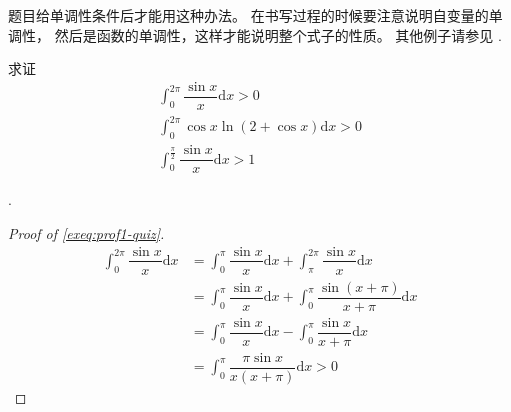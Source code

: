 题目给单调性条件后才能用这种办法。
在书写过程的时候要注意说明自变量的单调性，
然后是函数的单调性，这样才能说明整个式子的性质。
其他例子请参见 \cite[page 119, pdf 130]{we}.

\begin{example}
    求证
    \begin{gather}
        \label{exeq:prof1-quiz} \int_0^{2\pi} \dfrac{\sin x}{x} \mathrm dx > 0 \\
        \label{exeq:prof2-quiz} \int_0^{2\pi} \cos x \ln ( 2+ \cos x) \mathrm dx > 0 \\
        \label{exeq:prof3-quiz} \int_0^{\frac{\pi}{2}} \dfrac{\sin x}{x} \mathrm dx > 1
    \end{gather}

    \cite[question 183]{w660}.

    \begin{proof}[Proof of \ref{exeq:prof1-quiz}]
        \begin{align*}
            \int_0^{2\pi} \dfrac{\sin x}{x} \mathrm dx
            &= \int_0^{\pi} \dfrac{\sin x}{x} \mathrm dx 
            + \int_{\pi}^{2\pi} \dfrac{\sin x}{x} \mathrm dx \\
            &= \int_0^{\pi} \dfrac{\sin x}{x} \mathrm dx 
            + \int_{0}^{\pi} \dfrac{\sin (x + \pi)}{x + \pi} \mathrm dx \\
            &= \int_0^{\pi} \dfrac{\sin x}{x} \mathrm dx 
            - \int_{0}^{\pi} \dfrac{\sin x }{x + \pi} \mathrm dx \\
            &= \int_0^{\pi} \dfrac{\pi \sin x}{x(x + \pi)} \mathrm dx  > 0
        \end{align*}
    \end{proof}


\end{example}
